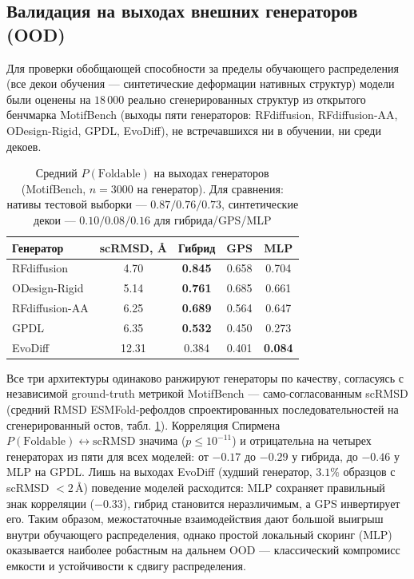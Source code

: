 \documentclass[12pt, a4paper]{article}
\begin{document}
\subsection{Валидация на выходах внешних генераторов (OOD)}
Для проверки обобщающей способности за пределы обучающего распределения (все декои обучения --- синтетические деформации нативных структур) модели были оценены на $18\,000$ реально сгенерированных структур из открытого бенчмарка MotifBench \cite{motifbench} (выходы пяти генераторов: RFdiffusion, RFdiffusion-AA, ODesign-Rigid, GPDL, EvoDiff), не встречавшихся ни в обучении, ни среди декоев.

\begin{table}[h]
\centering
\caption{Средний $P(\mathrm{Foldable})$ на выходах генераторов (MotifBench, $n=3000$ на генератор). Для сравнения: нативы тестовой выборки --- $0.87/0.76/0.73$, синтетические декои --- $0.10/0.08/0.16$ для гибрида/GPS/MLP}
\label{tab:ood}
\begin{tabular}{lcccc}
\toprule
\textbf{Генератор} & \textbf{scRMSD, \AA} & \textbf{Гибрид} & \textbf{GPS} & \textbf{MLP} \\
\midrule
RFdiffusion & 4.70 & \textbf{0.845} & 0.658 & 0.704 \\
ODesign-Rigid & 5.14 & \textbf{0.761} & 0.685 & 0.661 \\
RFdiffusion-AA & 6.25 & \textbf{0.689} & 0.564 & 0.647 \\
GPDL & 6.35 & \textbf{0.532} & 0.450 & 0.273 \\
EvoDiff & 12.31 & 0.384 & 0.401 & \textbf{0.084} \\
\bottomrule
\end{tabular}
\end{table}

Все три архитектуры одинаково ранжируют генераторы по качеству, согласуясь с независимой ground-truth метрикой MotifBench --- само-согласованным scRMSD (средний RMSD ESMFold-рефолдов спроектированных последовательностей на сгенерированный остов, табл. \ref{tab:ood}). Корреляция Спирмена $P(\mathrm{Foldable}) \leftrightarrow \mathrm{scRMSD}$ значима ($p \le 10^{-11}$) и отрицательна на четырех генераторах из пяти для всех моделей: от $-0.17$ до $-0.29$ у гибрида, до $-0.46$ у MLP на GPDL. Лишь на выходах EvoDiff (худший генератор, $3.1\%$ образцов с scRMSD $< 2\,\text{\AA}$) поведение моделей расходится: MLP сохраняет правильный знак корреляции ($-0.33$), гибрид становится неразличимым, а GPS инвертирует его. Таким образом, межостаточные взаимодействия дают большой выигрыш внутри обучающего распределения, однако простой локальный скоринг (MLP) оказывается наиболее робастным на дальнем OOD --- классический компромисс емкости и устойчивости к сдвигу распределения.
\end{document}
